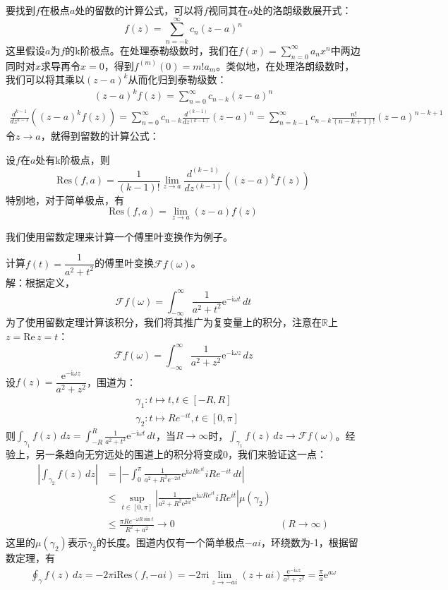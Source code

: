 要找到$f$在极点$a$处的留数的计算公式，可以将$f$视同其在$a$处的洛朗级数展开式：
\[f(z)=\sum_{n=-k}^{\infty}c_n(z-a)^n\]
这里假设$a$为$f$的k阶极点。在处理泰勒级数时，我们在$f(x)=\sum_{n=0}^{\infty}a_n x^n$中两边同时对$x$求导再令$x=0$，得到$f^{(m)}(0)=m!a_m$。类似地，在处理洛朗级数时，我们可以将其乘以$(z-a)^k$从而化归到泰勒级数：
\begin{align*}
    (z-a)^k f(z)=\sum_{n=0}^{\infty}c_{n-k}(z-a)^n
\end{align*}
\begin{align*}
    \frac{d^{k-1}}{dz^{k-1}}((z-a)^k f(z))=\sum_{n=0}^{\infty}c_{n-k}\frac{d^{(k-1)}}{dz^{(k-1)}}(z-a)^n=\sum_{n=k-1}^{\infty}c_{n-k}\frac{n!}{(n-k+1)!}(z-a)^{n-k+1}
\end{align*}
令$z\to a$，就得到留数的计算公式：\begin{proposition}
    设$f$在$a$处有k阶极点，则
    \[\text{Res}(f,a)=\frac{1}{(k-1)!}\lim_{z\to a}\frac{d^{(k-1)}}{dz^{(k-1)}}((z-a)^k f(z))\]
    特别地，对于简单极点，有
    \[\text{Res}(f,a)=\lim_{z\to a}(z-a)f(z)\]
\end{proposition}

我们使用留数定理来计算一个傅里叶变换作为例子。
\begin{example}
    计算$f(t)=\dfrac{1}{a^2+t^2}$的傅里叶变换$\mathcal{F} f(\omega)$。\\
    解：根据定义，$$\mathcal{F} f(\omega)=\int_{-\infty}^{\infty}\dfrac{1}{a^2+t^2}\mathrm{e}^{-\mathrm{i}\omega t}\,dt$$
    为了使用留数定理计算该积分，我们将其推广为复变量上的积分，注意在$\mathbb{R}$上$z=\text{Re}\,z=t$：
    \[\mathcal{F} f(\omega)=\int_{-\infty}^{\infty}\frac{1}{a^2+z^2}\mathrm{e}^{-\mathrm{i}\omega z}\,dz\]
    设$f(z)=\dfrac{\mathrm{e}^{-\mathrm{i}\omega z}}{a^2+z^2}$，围道为：\begin{align*}
        &\gamma_1:t\mapsto t,t\in[-R,R]\\
        &\gamma_2:t\mapsto Re^{-it},t\in[0,\pi]
    \end{align*}
    则$\int_{\gamma_1}f(z)\,dz=\int_{-R}^{R}\frac{1}{a^2+t^2}\mathrm{e}^{-\mathrm{i}\omega t}\,dt$，当$R\to\infty$时，$\int_{\gamma_1}f(z)\,dz\to \mathcal{F} f(\omega)$。经验上，另一条趋向无穷远处的围道上的积分将变成0，我们来验证这一点：\begin{align*}
        \left|\int_{\gamma_2}f(z)\,dz\right|&=\left|-\int_0^{\pi}\frac{1}{a^2+R^2\mathrm{e}^{-2it}}\mathrm{e}^{\mathrm{i}\omega Re^{it}}iRe^{-it}\,dt\right|\\
        &\leq \sup_{t\in[0,\pi]}\left|\frac{1}{a^2+R^2\mathrm{e}^{2it}}\mathrm{e}^{\mathrm{i}\omega Re^{it}}iRe^{it}\right|\mu(\gamma_2)\\
        &\leq \frac{\pi Re^{-\omega R\sin t}}{R^2+a^2}\to 0&(R\to\infty)
    \end{align*}
    这里的$\mu(\gamma_2)$表示$\gamma_2$的长度。围道内仅有一个简单极点$-ai$，环绕数为-1，根据留数定理，有
    \begin{align*}
        \oint_{\gamma}f(z)\,dz=-2\pi \mathrm{i}\text{Res}(f,-ai)=-2\pi \mathrm{i}\lim_{z\to -ai}(z+ai)\frac{\mathrm{e}^{-\mathrm{i}\omega z}}{a^2+z^2}=\frac{\pi}{a}\mathrm{e}^{a\omega}
    \end{align*}
\end{example}

